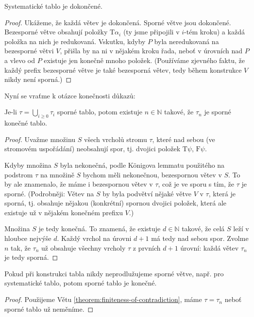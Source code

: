 \begin{lemma}\label{lemma:systematic-is-finished}
    Systematické tablo je dokončené.
\end{lemma}
\begin{proof}
    Ukážeme, že každá větev je dokončená. Sporné větve jsou dokončené. Bezesporné větve obsahují položky $\mathrm{T}\alpha_i$ (ty jsme připojili v $i$-tém kroku) a každá položka na nich je redukovaná. Vskutku, kdyby $P$ byla neredukovaná na bezesporné větvi $V$, přišla by na ni v nějakém kroku řada, neboť v úrovních nad $P$ a vlevo od $P$ existuje jen konečně mnoho položek. (Používáme zjevného faktu, že každý prefix bezesporné větve je také bezesporná větev, tedy během konstrukce $V$ nikdy není sporná.)
\end{proof}

Nyní se vraťme k otázce konečnosti důkazů:

\begin{theorem}\label{theorem:finiteness-of-contradiction}
    Je-li $\tau=\bigcup_{i\geq 0}\tau_i$ sporné tablo, potom existuje $n\in\mathbb N$ takové, že $\tau_n$ je sporné konečné tablo.
\end{theorem}
\begin{proof}
    Uvažme množinu $S$ všech vrcholů stromu $\tau$, které nad sebou (ve stromovém uspořádání) neobsahují spor, tj. dvojici položek $\mathrm{T}\psi$, $\mathrm{F}\psi$.

    Kdyby množina $S$ byla nekonečná, podle Königova lemmatu použitého na podstrom $\tau$ na množině $S$ bychom měli nekonečnou, bezespornou větev v $S$. To by ale znamenalo, že máme i bezespornou větev v $\tau$, což je ve sporu s tím, že $\tau$ je sporné. (Podrobněji: Větev na $S$ by byla podvětví nějaké větve $V$ v $\tau$, která je sporná, tj. obsahuje nějakou (konkrétní) spornou dvojici položek, která ale existuje už v nějakém konečném prefixu $V$.)

    Množina $S$ je tedy konečná. To znamená, že existuje $d\in\mathbb N$ takové, že celá $S$ leží v hloubce nejvýše $d$. Každý vrchol na úrovni $d+1$ má tedy nad sebou spor. Zvolme $n$ tak, že $\tau_n$ už obsahuje všechny vrcholy $\tau$ z prvních $d+1$ úrovní: každá větev $\tau_n$ je tedy sporná.
\end{proof}

\begin{corollary}\label{corollary:systematic-contradictory-is-finite}
    Pokud při konstrukci tabla nikdy neprodlužujeme sporné větve, např. pro systematické tablo, potom sporné tablo je konečné.
\end{corollary}
\begin{proof}
Použijeme Větu \ref{theorem:finiteness-of-contradiction}, máme $\tau=\tau_n$ neboť sporné tablo už neměníme.    
\end{proof}

